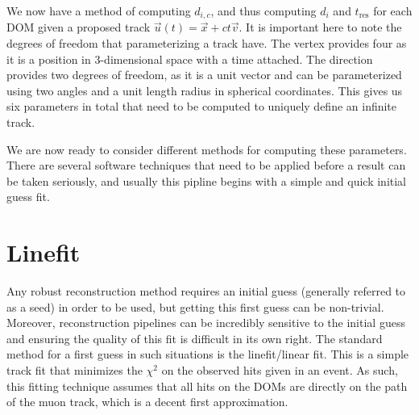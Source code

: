 We now have a method of computing $d_{i,c}$, and thus computing $d_{i}$ and $t_{\text{res}}$ for each DOM given a proposed track $\vec{u}(t) = \vec{x} + ct\vec{v}$. It is important here to note the degrees of freedom that parameterizing a track have. The vertex provides four as it is a position in 3-dimensional space with a time attached. The direction provides two degrees of freedom, as it is a unit vector and can be parameterized using two angles and a unit length radius in spherical coordinates. This gives us six parameters in total that need to be computed to uniquely define an infinite track. 

We are now ready to consider different methods for computing these parameters. There are several software techniques that need to be applied before a result can be taken seriously, and usually this pipline begins with a simple and quick initial guess fit. 

\section{Linefit}

Any robust reconstruction method requires an initial guess (generally referred to as a seed) in order to be used, but getting this first guess can be non-trivial. Moreover, reconstruction pipelines can be incredibly sensitive to the initial guess and ensuring the quality of this fit is difficult in its own right. The standard method for a first guess in such situations is the linefit/linear fit. This is a simple track fit that minimizes the $\chi^{2}$ on the observed hits given in an event. As such, this fitting technique assumes that all hits on the DOMs are directly on the path of the muon track, which is a decent first approximation.

